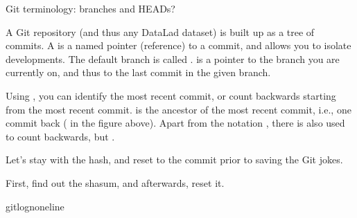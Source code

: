 \ignorespaces \begin{findoutmore}[label={fom-git-heads}, before title={\thetcbcounter\ }, float, floatplacement=tbp, check odd page=true]{Git terminology: branches and HEADs?}
\label{\detokenize{basics/101-137-history:fom-git-heads}}

\sphinxAtStartPar
A Git repository (and thus any DataLad dataset) is built up as a tree of
commits. A  is a named pointer (reference) to a commit, and allows you
to isolate developments. The default branch is called .  is
a pointer to the branch you are currently on, and thus to the last commit
in the given branch.


\sphinxAtStartPar
Using , you can identify the most recent commit, or count backwards
starting from the most recent commit.  is the ancestor of the most
recent commit, i.e., one commit back ( in the figure above). Apart from
the notation , there is also  used to count backwards, but
.


\end{findoutmore}

\sphinxAtStartPar
Let’s stay with the hash, and reset to the commit prior to saving the Git jokes.

\sphinxAtStartPar
First, find out the shasum, and afterwards, reset it.

\begin{sphinxVerbatim}[commandchars=\\\{\}]
gitlog\PYGZhy{}n\PYGZhy{}\PYGZhy{}oneline
\end{sphinxVerbatim}

